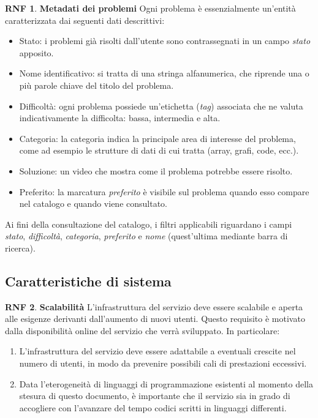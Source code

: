 \documentclass[11pt, a4paper]{article}
\theoremstyle{definition}
\newtheorem{nonfuncreq}{RNF} %
\begin{document}
\begin{nonfuncreq}
\label{metadata}
\textbf{Metadati dei problemi } Ogni problema è essenzialmente un'entità
caratterizzata dai seguenti dati descrittivi:
\begin{itemize}
    \item Stato: i problemi già risolti dall'utente sono contrassegnati
    in un campo \textit{stato} apposito.

    \item Nome identificativo: si tratta di una stringa alfanumerica, che
    riprende una o più parole chiave del titolo del problema.
    
    \item Difficoltà: ogni problema possiede un'etichetta (\textit{tag})
    associata che ne valuta indicativamente la difficolta: bassa,
    intermedia e alta.

    \item Categoria: la categoria indica la principale area di interesse
    del problema, come ad esempio le strutture di dati di cui tratta
    (array, grafi, code, ecc.).

    \item Soluzione: un video che mostra come il problema potrebbe essere
    risolto.

    \item Preferito: la marcatura \textit{preferito} è visibile sul problema
    quando esso compare nel catalogo e quando viene consultato.
\end{itemize}
Ai fini della consultazione del catalogo, i filtri applicabili riguardano
i campi \textit{stato}, \textit{difficoltà}, \textit{categoria}, \textit{preferito}
e \textit{nome} (quest'ultima mediante barra di ricerca).
\end{nonfuncreq}

\subsection{Caratteristiche di sistema}

\begin{nonfuncreq}
\label{scalabilita}
\textbf{Scalabilità }
L'infrastruttura del servizio deve essere scalabile e aperta alle esigenze
derivanti dall'aumento di nuovi utenti. Questo requisito è motivato dalla
disponibilità online del servizio che verrà sviluppato. In particolare:
\begin{enumerate}
    \item L'infrastruttura del servizio deve essere adattabile a eventuali
    crescite nel numero di utenti, in modo da prevenire possibili cali di
    prestazioni eccessivi.

    \item Data l'eterogeneità di linguaggi di programmazione esistenti
    al momento della stesura di questo documento, è importante che il
    servizio sia in grado di accogliere con l'avanzare del tempo codici
    scritti in linguaggi differenti.
\end{enumerate}
\end{nonfuncreq}
\end{document}
